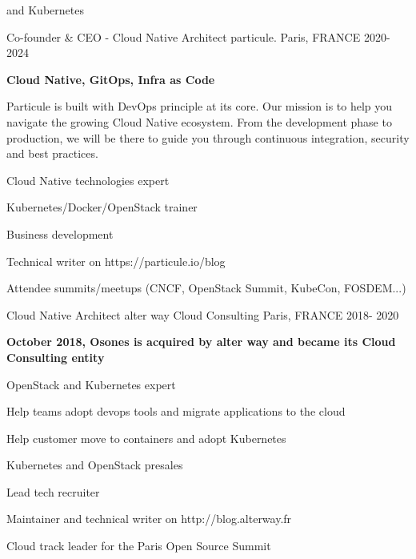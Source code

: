 \begin{cventries}
{\begin{cvitems}
{          and Kubernetes}
      \end{cvitems}
    }
%
\cventry
    {Co-founder \& CEO - Cloud Native Architect} %
    {particule.} %
    {Paris, FRANCE} %
    {2020-2024} %
    {
      \begin{cvitems} %
      \item {\textbf{Cloud Native, GitOps, Infra as Code}}
      \item {Particule is built with DevOps principle at its core. Our mission
        is to help you navigate the growing Cloud Native ecosystem. From the
          development phase to production, we will be there to guide you
          through continuous integration, security and best practices.}
        \item {Cloud Native technologies expert}
        \item {Kubernetes/Docker/OpenStack trainer}
        \item {Business development}
        \item {Technical writer on https://particule.io/blog}
        \item {Attendee summits/meetups (CNCF, OpenStack Summit, KubeCon, FOSDEM...)}
      \end{cvitems}
    }

  \cventry
    {Cloud Native Architect} %
    {alter way Cloud Consulting} %
    {Paris, FRANCE} %
    {2018- 2020} %
    {
      \begin{cvitems} %
      \item {\textbf{October 2018, Osones is acquired by alter way and became
        its Cloud Consulting entity}}
      \item {OpenStack and Kubernetes expert}
      \item {Help teams adopt devops tools and migrate applications to the
        cloud}
      \item {Help customer move to containers and adopt Kubernetes}
      \item {Kubernetes and OpenStack presales}
      \item {Lead tech recruiter}
      \item {Maintainer and technical writer on http://blog.alterway.fr}
      \item {Cloud track leader for the Paris Open Source Summit}
      \end{cvitems}
    }


\end{cventries}
